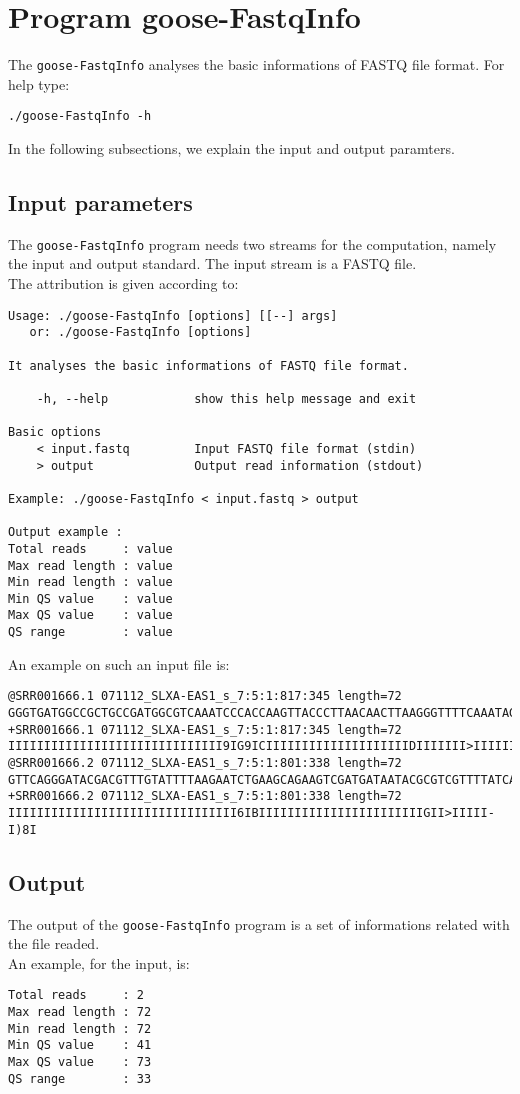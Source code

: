 \section{Program goose-FastqInfo}
The \texttt{goose-FastqInfo} analyses the basic informations of FASTQ file format.
For help type:
\begin{lstlisting}
./goose-FastqInfo -h
\end{lstlisting}
In the following subsections, we explain the input and output paramters.

\subsection*{Input parameters}

The \texttt{goose-FastqInfo} program needs two streams for the computation,
namely the input and output standard. The input stream is a FASTQ file.\\
The attribution is given according to:
\begin{lstlisting}
Usage: ./goose-FastqInfo [options] [[--] args]
   or: ./goose-FastqInfo [options]

It analyses the basic informations of FASTQ file format.

    -h, --help            show this help message and exit

Basic options
    < input.fastq         Input FASTQ file format (stdin)
    > output              Output read information (stdout)

Example: ./goose-FastqInfo < input.fastq > output

Output example :
Total reads     : value
Max read length : value
Min read length : value
Min QS value    : value
Max QS value    : value
QS range        : value
\end{lstlisting}
An example on such an input file is:
\begin{lstlisting}
@SRR001666.1 071112_SLXA-EAS1_s_7:5:1:817:345 length=72
GGGTGATGGCCGCTGCCGATGGCGTCAAATCCCACCAAGTTACCCTTAACAACTTAAGGGTTTTCAAATAGA
+SRR001666.1 071112_SLXA-EAS1_s_7:5:1:817:345 length=72
IIIIIIIIIIIIIIIIIIIIIIIIIIIIII9IG9ICIIIIIIIIIIIIIIIIIIIIDIIIIIII>IIIIII/
@SRR001666.2 071112_SLXA-EAS1_s_7:5:1:801:338 length=72
GTTCAGGGATACGACGTTTGTATTTTAAGAATCTGAAGCAGAAGTCGATGATAATACGCGTCGTTTTATCAT
+SRR001666.2 071112_SLXA-EAS1_s_7:5:1:801:338 length=72
IIIIIIIIIIIIIIIIIIIIIIIIIIIIIIII6IBIIIIIIIIIIIIIIIIIIIIIIIGII>IIIII-I)8I
\end{lstlisting}

\subsection*{Output}
The output of the \texttt{goose-FastqInfo} program is a set of informations related with the file readed. \\
An example, for the input, is:
\begin{lstlisting}
Total reads     : 2
Max read length : 72
Min read length : 72
Min QS value    : 41
Max QS value    : 73
QS range        : 33
\end{lstlisting}
